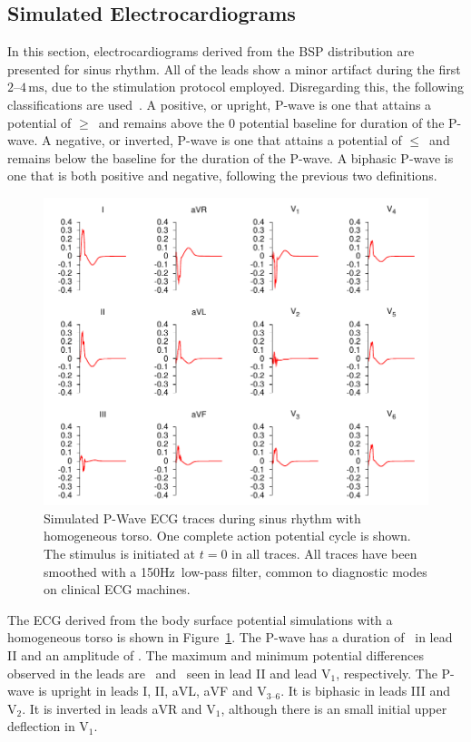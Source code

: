 \subsection{Simulated Electrocardiograms}

In this section, electrocardiograms derived from the BSP distribution are
presented for sinus rhythm.
All of the leads show a minor artifact during the first
$2\text{--}4\,\text{ms}$, due to the stimulation protocol employed.
Disregarding this, the following classifications are used~\cite{kistler2006}.
A positive, or upright, P-wave is one that attains a potential of
$\geq$\ and remains above the 0 potential baseline for duration of the
P-wave.
A negative, or inverted, P-wave is one that attains a potential of
$\leq$\ and remains below the baseline for the duration of the P-wave.
A biphasic P-wave is one that is both positive and negative, following the
previous two definitions.


\begin{figure}
\includegraphics{figures/bsp/ecg_thorax_150Hz}
\caption[12 lead P-wave ECG during sinus rhythm with homogeneous torso]{
\label{bsp:fig:ecg_thorax}
Simulated P-Wave ECG traces during sinus rhythm with homogeneous torso.
One complete action potential cycle is shown.
The stimulus is initiated at $t = 0$ in all traces.
All traces have been smoothed with a \unit{150}{Hz}\ low-pass filter, common to
diagnostic modes on clinical ECG machines.
}
\end{figure}

The ECG derived from the body surface potential simulations with a homogeneous
torso is shown in Figure~\ref{bsp:fig:ecg_thorax}.
The P-wave has a duration of \ in lead II and an amplitude of .
The maximum and minimum potential differences observed in the leads are
\ and \ seen in lead II and lead $\text{V}_{1}$, respectively.
The P-wave is upright in leads I, II, aVL, aVF and $\text{V}_{\text{3--6}}$.
It is biphasic in leads III and $\text{V}_{\text{2}}$.
It is inverted in leads aVR and $\text{V}_{\text{1}}$, although there is an small
initial upper deflection in $\text{V}_{\text{1}}$.

